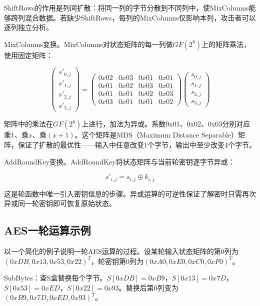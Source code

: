 ShiftRows的作用是列间扩散：将同一列的字节分散到不同列中，使MixColumns能够跨列混合数据。若缺少ShiftRows，每列的MixColumns仅影响本列，攻击者可以逐列独立分析。

MixColumns变换。MixColumns对状态矩阵的每一列做$GF(2^8)$上的矩阵乘法，使用固定矩阵：

\begin{equation}
\begin{pmatrix} s'_{0,j} \\ s'_{1,j} \\ s'_{2,j} \\ s'_{3,j} \end{pmatrix} = \begin{pmatrix} 0x02 & 0x03 & 0x01 & 0x01 \\ 0x01 & 0x02 & 0x03 & 0x01 \\ 0x01 & 0x01 & 0x02 & 0x03 \\ 0x03 & 0x01 & 0x01 & 0x02 \end{pmatrix} \begin{pmatrix} s_{0,j} \\ s_{1,j} \\ s_{2,j} \\ s_{3,j} \end{pmatrix}
\end{equation}

矩阵中的乘法在$GF(2^8)$上进行，加法为异或。系数0x01、0x02、0x03分别对应乘1、乘$x$、乘$(x+1)$。这个矩阵是MDS（Maximum Distance Separable）矩阵，保证了扩散的最优性——输入中任意改变1个字节，输出中至少改变4个字节。

AddRoundKey变换。AddRoundKey将状态矩阵与当前轮密钥逐字节异或：

\begin{equation}
s'_{i,j} = s_{i,j} \oplus k_{i,j}
\end{equation}

这是轮函数中唯一引入密钥信息的步骤。异或运算的可逆性保证了解密时只需再次异或同一轮密钥即可恢复原始状态。

\subsection{AES一轮运算示例}

以一个简化的例子说明一轮AES运算的过程。设某轮输入状态矩阵的第0列为$(0xDB, 0x13, 0x53, 0x22)^T$，轮密钥第0列为$(0xA0, 0xE0, 0xC0, 0xF0)^T$。

SubBytes：查S盒替换每个字节。$S[0xDB] = 0xB9$，$S[0x13] = 0x7D$，$S[0x53] = 0xED$，$S[0x22] = 0x93$。替换后第0列变为$(0xB9, 0x7D, 0xED, 0x93)^T$。

